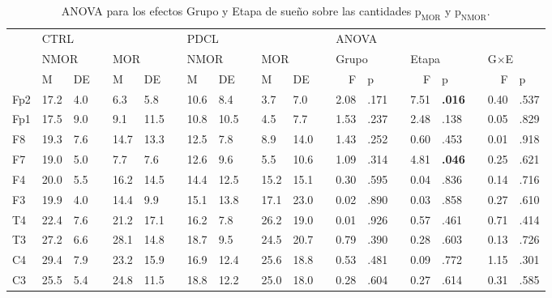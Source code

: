 \documentclass[12pt,letterpaper]{book}
\begin{document}
{
\setlength\tabcolsep{3pt}
\begin{table}
\centering
\caption{ANOVA para los efectos Grupo y Etapa de sueño sobre las cantidades $\text{p}_{\text{MOR}}$ y $\text{p}_{\text{NMOR}}$.}
\label{tabla:anova_prop}
\begin{small}
\begin{tabular}{lllllllllllllrllrllrl}
\toprule
 & \multicolumn{5}{l}{CTRL} &  & \multicolumn{5}{l}{PDCL} &  & \multicolumn{8}{l}{ANOVA} \\
\cmidrule{2-6} \cmidrule{8-12} \cmidrule{14-21}
 & \multicolumn{2}{l}{NMOR} &  & \multicolumn{2}{l}{MOR} &  & \multicolumn{2}{l}{NMOR} &  & \multicolumn{2}{l}{MOR} &  & \multicolumn{2}{l}{Grupo} &  & \multicolumn{2}{l}{Etapa} &  & \multicolumn{2}{l}{G$\times$E} \\
\cmidrule{2-3} \cmidrule{5-6} \cmidrule{8-9} \cmidrule{11-12} \cmidrule{14-15} \cmidrule{17-18} \cmidrule{20-21} 
 & M & DE & & M & DE & & M & DE & & M & DE & & F & p & & F & p & & F & p \\
\midrule
Fp2 & 17.2 & 4.0  &  & 6.3  & 5.8  &  & 10.6 & 8.4  &  & 3.7  & 7.0  &  & 2.08 & .171 &  & 7.51  &\bf .016 &  & 0.40 & .537 \\
Fp1 & 17.5 & 9.0  &  & 9.1  & 11.5 &  & 10.8 & 10.5 &  & 4.5  & 7.7  &  & 1.53 & .237 &  & 2.48  & .138 &  & 0.05 & .829 \\
F8  & 19.3 & 7.6  &  & 14.7 & 13.3 &  & 12.5 & 7.8  &  & 8.9  & 14.0 &  & 1.43 & .252 &  & 0.60  & .453 &  & 0.01 & .918 \\
F7  & 19.0 & 5.0  &  & 7.7  & 7.6  &  & 12.6 & 9.6  &  & 5.5  & 10.6 &  & 1.09 & .314 &  & 4.81  &\bf .046 &  & 0.25 & .621 \\
F4  & 20.0 & 5.5  &  & 16.2 & 14.5 &  & 14.4 & 12.5 &  & 15.2 & 15.1 &  & 0.30 & .595 &  & 0.04  & .836 &  & 0.14 & .716 \\
F3  & 19.9 & 4.0  &  & 14.4 & 9.9  &  & 15.1 & 13.8 &  & 17.1 & 23.0 &  & 0.02 & .890 &  & 0.03  & .858 &  & 0.27 & .610 \\
T4  & 22.4 & 7.6  &  & 21.2 & 17.1 &  & 16.2 & 7.8  &  & 26.2 & 19.0 &  & 0.01 & .926 &  & 0.57  & .461 &  & 0.71 & .414 \\
T3  & 27.2 & 6.6  &  & 28.1 & 14.8 &  & 18.7 & 9.5  &  & 24.5 & 20.7 &  & 0.79 & .390 &  & 0.28  & .603 &  & 0.13 & .726 \\
C4  & 29.4 & 7.9  &  & 23.2 & 15.9 &  & 16.9 & 12.4 &  & 25.6 & 18.8 &  & 0.53 & .481 &  & 0.09  & .772 &  & 1.15 & .301 \\
C3  & 25.5 & 5.4  &  & 24.8 & 11.5 &  & 18.8 & 12.2 &  & 25.0 & 18.0 &  & 0.28 & .604 &  & 0.27  & .614 &  & 0.31 & .585 \\

\end{tabular}
\end{small}
\end{table}}
\end{document}
